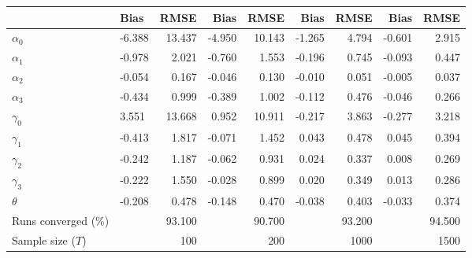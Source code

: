 
\begin{tabular}[t]{llrrrrrrr}
\toprule
  & Bias & RMSE & Bias & RMSE & Bias & RMSE & Bias & RMSE\\
\midrule
$\alpha_{0}$ & -6.388 & 13.437 & -4.950 & 10.143 & -1.265 & 4.794 & -0.601 & 2.915\\
$\alpha_{1}$ & -0.978 & 2.021 & -0.760 & 1.553 & -0.196 & 0.745 & -0.093 & 0.447\\
$\alpha_{2}$ & -0.054 & 0.167 & -0.046 & 0.130 & -0.010 & 0.051 & -0.005 & 0.037\\
$\alpha_{3}$ & -0.434 & 0.999 & -0.389 & 1.002 & -0.112 & 0.476 & -0.046 & 0.266\\
$\gamma_{0}$ & 3.551 & 13.668 & 0.952 & 10.911 & -0.217 & 3.863 & -0.277 & 3.218\\
$\gamma_{1}$ & -0.413 & 1.817 & -0.071 & 1.452 & 0.043 & 0.478 & 0.045 & 0.394\\
$\gamma_{2}$ & -0.242 & 1.187 & -0.062 & 0.931 & 0.024 & 0.337 & 0.008 & 0.269\\
$\gamma_{3}$ & -0.222 & 1.550 & -0.028 & 0.899 & 0.020 & 0.349 & 0.013 & 0.286\\
$\theta$ & -0.208 & 0.478 & -0.148 & 0.470 & -0.038 & 0.403 & -0.033 & 0.374\\
Runs converged (\%) &  & 93.100 &  & 90.700 &  & 93.200 &  & 94.500\\
Sample size ($T$) &  & 100 &  & 200 &  & 1000 &  & 1500\\
\bottomrule
\end{tabular}
